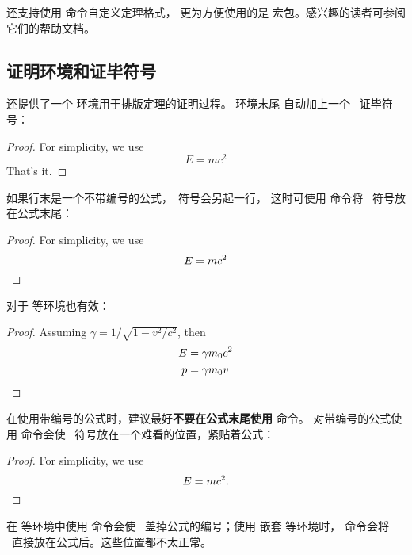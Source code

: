  还支持使用  命令自定义定理格式，
更为方便使用的是  宏包。感兴趣的读者可参阅它们的帮助文档。

\subsection{证明环境和证毕符号}\label{subsec:proof}

 还提供了一个  环境用于排版定理的证明过程。 环境末尾
自动加上一个 \qedsymbol\ 证毕符号：
\begin{example}
\begin{proof}
For simplicity, we use
\[
E=mc^2
\]
That's it.
\end{proof}
\end{example}

如果行末是一个不带编号的公式，\qedsymbol\ 符号会另起一行，
这时可使用  命令将 \qedsymbol\ 符号放在公式末尾：
\begin{example}
\begin{proof}
For simplicity, we use
\[
E=mc^2 \qedhere
\]
\end{proof}
\end{example}

 对于  等环境也有效：
\begin{example}
\begin{proof}
Assuming $\gamma
= 1/\sqrt{1-v^2/c^2}$, then
\begin{align*}
E &= \gamma m_0 c^2  \\
p &= \gamma m_0v \qedhere
\end{align*}
\end{proof}
\end{example}

在使用带编号的公式时，建议最好\textbf{不要在公式末尾使用}  命令。
对带编号的公式使用  命令会使 \qedsymbol\ 符号放在一个难看的位置，紧贴着公式：
\begin{example}
\begin{proof}
For simplicity, we use
\begin{equation}
E=mc^2.\qedhere
\end{equation}
\end{proof}
\end{example}

在  等环境中使用  命令会使 \qedsymbol\ 盖掉公式的编号；使用  嵌套
 等环境时， 命令会将 \qedsymbol\ 直接放在公式后。这些位置都不太正常。

